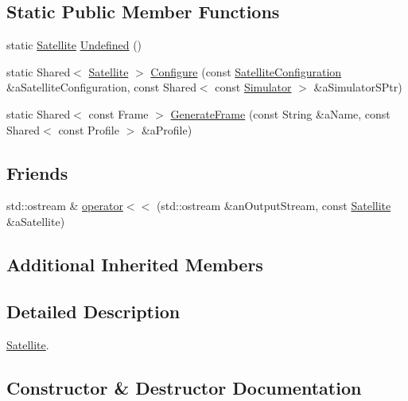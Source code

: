 \subsection*{Static Public Member Functions}
\begin{DoxyCompactItemize}
\item 
static \hyperlink{classostk_1_1simulation_1_1_satellite}{Satellite} \hyperlink{classostk_1_1simulation_1_1_satellite_a27b1931fa0cdd157ea5920060caf05fd}{Undefined} ()
\item 
static Shared$<$ \hyperlink{classostk_1_1simulation_1_1_satellite}{Satellite} $>$ \hyperlink{classostk_1_1simulation_1_1_satellite_a8984ad4a21ba686cbae3bbfbb7d5ebb3}{Configure} (const \hyperlink{structostk_1_1simulation_1_1_satellite_configuration}{Satellite\+Configuration} \&a\+Satellite\+Configuration, const Shared$<$ const \hyperlink{classostk_1_1simulation_1_1_simulator}{Simulator} $>$ \&a\+Simulator\+S\+Ptr)
\item 
static Shared$<$ const Frame $>$ \hyperlink{classostk_1_1simulation_1_1_satellite_a39a4b79c04d242d85cb647abd23e9e61}{Generate\+Frame} (const String \&a\+Name, const Shared$<$ const Profile $>$ \&a\+Profile)
\end{DoxyCompactItemize}
\subsection*{Friends}
\begin{DoxyCompactItemize}
\item 
std\+::ostream \& \hyperlink{classostk_1_1simulation_1_1_satellite_a4c904b132bff149960ba9d910ebbc3dc}{operator$<$$<$} (std\+::ostream \&an\+Output\+Stream, const \hyperlink{classostk_1_1simulation_1_1_satellite}{Satellite} \&a\+Satellite)
\end{DoxyCompactItemize}
\subsection*{Additional Inherited Members}


\subsection{Detailed Description}
\hyperlink{classostk_1_1simulation_1_1_satellite}{Satellite}. 

\subsection{Constructor \& Destructor Documentation}
\mbox{\label{classostk_1_1simulation_1_1_satellite_afda29251d6d1bb5b6921248772b7d8c4}} 
